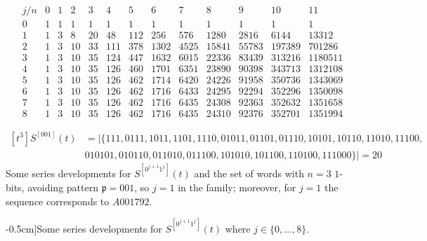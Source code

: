 \begin{table}
\begin{equation*}
\begin{array}{c|cccccccccccc}
    j/n & 0 & 1 & 2 & 3 & 4 & 5 & 6 & 7 & 8 & 9 & 10 & 11\\\hline0 & 1 & 1 & 1 & 1 & 1 & 1 & 1 & 1 & 1 & 1 & 1 & 1\\1 & 1 & 3 & 8 & 20 & 48 & 112 & 256 & 576 & 1280 & 2816 & 6144 & 13312\\2 & 1 & 3 & 10 & 33 & 111 & 378 & 1302 & 4525 & 15841 & 55783 & 197389 & 701286\\3 & 1 & 3 & 10 & 35 & 124 & 447 & 1632 & 6015 & 22336 & 83439 & 313216 & 1180511\\4 & 1 & 3 & 10 & 35 & 126 & 460 & 1701 & 6351 & 23890 & 90398 & 343713 & 1312108\\5 & 1 & 3 & 10 & 35 & 126 & 462 & 1714 & 6420 & 24226 & 91958 & 350736 & 1343069\\6 & 1 & 3 & 10 & 35 & 126 & 462 & 1716 & 6433 & 24295 & 92294 & 352296 & 1350098\\7 & 1 & 3 & 10 & 35 & 126 & 462 & 1716 & 6435 & 24308 & 92363 & 352632 & 1351658\\8 & 1 & 3 & 10 & 35 & 126 & 462 & 1716 & 6435 & 24310 & 92376 & 352701 & 1351994
\end{array}
\end{equation*}

\begin{displaymath}
    \begin{split}
    [t^{3}]S^{[001]}(t) &= \big|\lbrace 111, 0111, 1011, 1101, 1110, 01011, 01101, 01110, 10101, 10110, 11010, 11100,\\
    & 010101, 010110, 011010, 011100, 101010, 101100, 110100, 111000\rbrace\big| = 20
    \end{split}
\end{displaymath}
{Some series developments for $S^{[0^{j+1}1^j]}(t)$ and the set of
words with $n=3$ $1$-bits, avoiding pattern $\mathfrak{p}=001$, so $j=1$ in the
family; moreover, for $j=1$ the sequence corresponds to $A001792$.}
\caption[][-0.5cm]{Some series developments for $S^{[0^{j+1}1^j]}(t)$ where $j\in \lbrace
0,\ldots,8 \rbrace$.}
\label{tbl:S0_j1:1_j}
\end{table}


